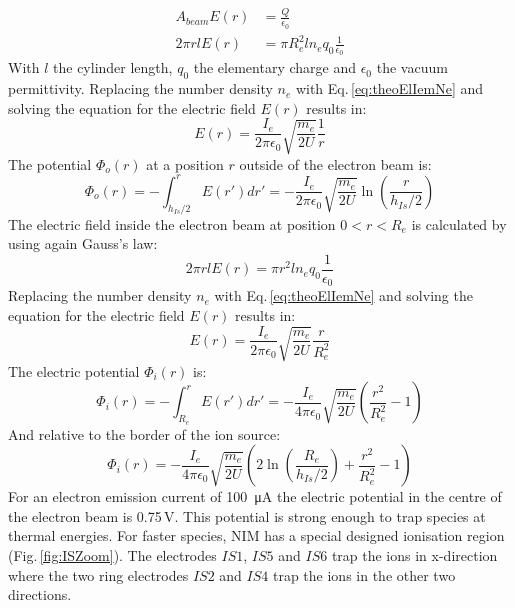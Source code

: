 	\begin{align}
		A_{beam} E(r) &= \frac{Q}{\epsilon_0}\\
		2\pi r l E(r) &= \pi R_e^2 l n_e q_0 \frac{1}{\epsilon_0}
	\end{align}
	With $l$ the cylinder length, $q_0$ the elementary charge and $\epsilon_0$ the vacuum permittivity. Replacing the number density $n_e$ with Eq.\,\eqref{eq:theoElIemNe} and solving the equation for the electric field $E(r)$ results in:
	\begin{equation}
		E(r) = \frac{I_e}{2 \pi \epsilon_0} \sqrt{\frac{m_e}{2U}}\frac{1}{r}
	\end{equation}
	The potential $\Phi_o (r)$ at a position $r$ outside of the electron beam is:
	\begin{equation}
		\Phi_o (r) = -\int_{h_{Is}/2}^{r} E(r') dr' = -\frac{I_e}{2\pi\epsilon_0}\sqrt{\frac{m_e}{2U}}\ln\left(\frac{r}{h_{Is}/2}\right)
	\end{equation}
	The electric field inside the electron beam at position $0<r<R_e$ is calculated by using again Gauss's law:
	\begin{equation}
		2\pi r l E(r) = \pi r^2 l n_e q_0 \frac{1}{\epsilon_0}
	\end{equation}
	Replacing the number density $n_e$ with Eq.\,\eqref{eq:theoElIemNe} and solving the equation for the electric field $E(r)$ results in:
	\begin{equation}
		E(r) = \frac{I_e}{2\pi\epsilon_0}\sqrt{\frac{m_e}{2U}}\frac{r}{R_e^2}
	\end{equation}
	The electric potential $\Phi_i (r)$ is:
	\begin{equation}
		\Phi_i (r) = -\int_{R_e}^{r} E(r') dr' = -\frac{I_e}{4\pi\epsilon_0}\sqrt{\frac{m_e}{2U}}\left(\frac{r^2}{R_e^2} -1 \right)
	\end{equation}
	And relative to the border of the ion source:
	\begin{equation}
		\Phi_i (r) = -\frac{I_e}{4\pi\epsilon_0}\sqrt{\frac{m_e}{2U}}\left(2\ln\left(\frac{R_e}{h_{Is}/2}\right) +\frac{r^2}{R_e^2} -1 \right)
		\label{eq:elPotIem}
	\end{equation}
	For an electron emission current of 100~\si{\micro\ampere} the electric potential in the centre of the electron beam is 0.75\,\si{\volt}. This potential is strong enough to trap species at thermal energies. For faster species, NIM has a special designed ionisation region (Fig.\,\ref{fig:ISZoom}). The electrodes $IS 1$, $IS 5$ and $IS 6$ trap the ions in x-direction where the two ring electrodes $IS 2$ and $IS 4$ trap the ions in the other two directions.		
